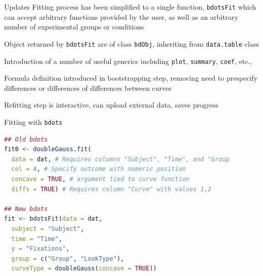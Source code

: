 \documentclass{beamer}
\begin{document}
\begin{frame}{Updates}
Fitting process has been simplified to a single function, \texttt{bdotsFit} which can accept arbitrary functions provided by the user, as well as an arbitrary number of experimental groups or conditions \newline

Object returned by \texttt{bdotsFit} are of class \texttt{bdObj}, inheriting from \texttt{data.table} class \newline

Introduction of a number of useful generics including \texttt{plot}, \texttt{summary}, \texttt{coef}, etc., \newline 

Formula definition introduced in bootstrapping step, removing need to prespecify differences or differences of differences between curves \newline 

Refitting step is interactive, can upload external data, saves progress \newline 

\end{frame}



\begin{frame}[fragile]{Fitting with \texttt{bdots}}
\lstset{basicstyle=\footnotesize\ttfamily, style = rstyle}
\begin{lstlisting}[language=R, showstringspaces=false,deletekeywords={data,col,time,c,}]
## Old bdots
fit0 <- doubleGauss.fit(
  data = dat, # Requires columns "Subject", "Time", and "Group
  col = 4, # Specify outcome with numeric position
  concave = TRUE, # argument tied to curve function
  diffs = TRUE) # Requires column "Curve" with values 1,2
  
## New bdots
fit <- bdotsFit(data = dat,
  subject = "Subject",
  time = "Time",
  y = "Fixations",
  group = c("Group", "LookType"),
  curveType = doubleGauss(concave = TRUE))
\end{lstlisting}
\end{frame}
\end{document}
